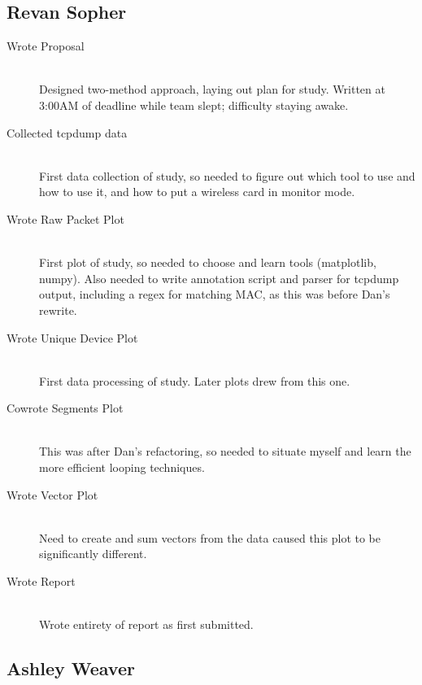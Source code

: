 \documentclass[12pt,journal,compsoc]{IEEEtran} %
\newcommand{\ditem}[2]{\item[#1] \hfill \\ #2}
\begin{document}
\subsection*{Revan Sopher}
\begin{description}
\item [Wrote Proposal] \hfill \\
	Designed two-method approach, laying out plan for study. Written at 3:00AM of deadline while team slept; difficulty staying awake.
\item [Collected tcpdump data] \hfill \\
	First data collection of study, so needed to figure out which tool to use and how to use it, and how to put a wireless card in monitor mode.
\item [Wrote Raw Packet Plot] \hfill \\
	First plot of study, so needed to choose and learn tools (matplotlib, numpy). Also needed to write annotation script and parser for tcpdump output, including a regex for matching MAC, as this was before Dan's rewrite.
\item [Wrote Unique Device Plot] \hfill \\
	First data processing of study. Later plots drew from this one.
\item [Cowrote Segments Plot] \hfill \\
	This was after Dan's refactoring, so needed to situate myself and learn the more efficient looping techniques.
\item [Wrote Vector Plot] \hfill \\
	Need to create and sum vectors from the data caused this plot to be significantly different.
\item [Wrote Report] \hfill \\
	Wrote entirety of report as first submitted.
\end{description}

\subsection*{Ashley Weaver}
\begin{description}{}
\ditem{Collected bus data}{}
\ditem{Cowrote Poster}{}
\ditem{Commented on report}{}
\end{description}
\end{document}

